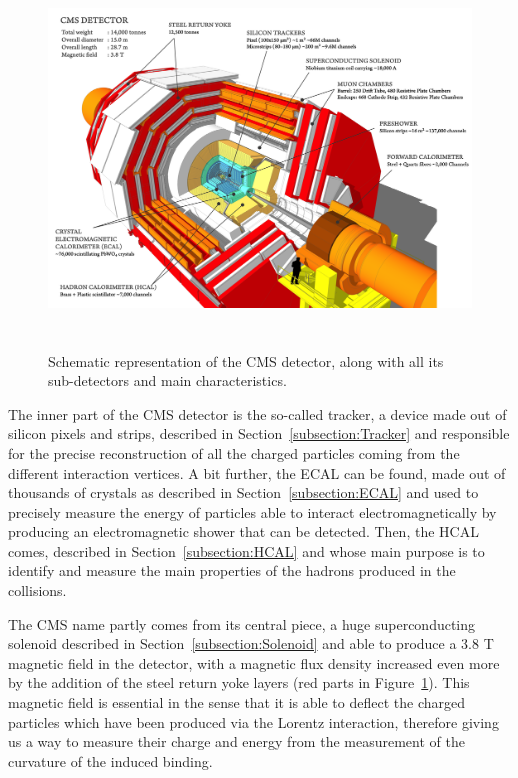 \documentclass[a4paper, 10pt, openright]{report}
\begin{document}
\begin{figure}[htbp]
\begin{center}
\includegraphics[width=15cm, height=10cm]{figs/CMS.png}
\caption{Schematic representation of the \ac{CMS} detector, along with all its sub-detectors and main characteristics.}
\label{fig:CMS}
\end{center}
\end{figure}

The inner part of the \ac{CMS} detector is the so-called tracker, a device made out of silicon pixels and strips, described in Section~\ref{subsection:Tracker} and responsible for the precise reconstruction of all the charged particles coming from the different interaction vertices. A bit further, the \acf{ECAL} can be found, made out of thousands of crystals as described in Section~\ref{subsection:ECAL} and used to precisely measure the energy of particles able to interact electromagnetically by producing an electromagnetic shower that can be detected. Then, the \acf{HCAL} comes, described in Section~\ref{subsection:HCAL} and whose main purpose is to identify and measure the main properties of the hadrons produced in the collisions.

The \ac{CMS} name partly comes from its central piece, a huge superconducting solenoid described in Section~\ref{subsection:Solenoid} and able to produce a 3.8 T magnetic field in the detector, with a magnetic flux density increased even more by the addition of the steel return yoke layers (red parts in Figure~\ref{fig:CMS}). This magnetic field is essential in the sense that it is able to deflect the charged particles which have been produced via the Lorentz interaction, therefore giving us a way to measure their charge and energy from the measurement of the curvature of the induced binding.
\end{document}
